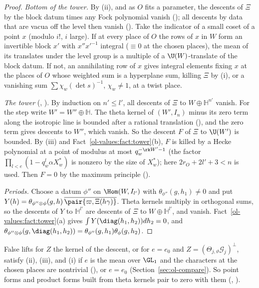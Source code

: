 \begin{proof}
\emph{Bottom of the tower.} By (ii), and as $O$ fits a parameter, the descents of $\Xi$ by the block
datum times any Fock polynomial vanish (); all descents
by data that are vacua off the level then vanish
(). Take the indicator of a small coset of a point $x$ (modulo $i!$, $i$ large). If at every place of
$O$ the rows of $x$ in $W$ form an invertible block $x'$ with $x''x'^{-1}$ integral ($\equiv0$ at
the chosen places), the mean of its translates under the level group is a multiple of a
$\U(W)$-translate of the block datum. If not, an annihilating row of $x$ gives integral elements
fixing $x$ at the places of $O$ whose weighted sum is a hyperplane sum, killing $\Xi$ by (i), or a
vanishing sum $\sum\chi_w(\det s)^{-1}$, $\chi_w\ne1$, at a twist place.

\emph{The tower} (,
). By induction on $n'\le l'$, all descents of $\Xi$ to
$W\oplus\mathbb H^{n'}$ vanish. For the step write $W'=W''\oplus\mathbb H$. The theta kernel of
$(W',I_n)$ minus its zero term along the isotropic line is bounded after a rational translation
(), and the zero term gives descents to
$W''$, which vanish. So the descent $F$ of $\Xi$ to $\U(W')$ is bounded. By (iii) and
Fact~\ref{ol-values:fact:tower}(b), $F$ is killed by a Hecke polynomial at a point of modulus at
most $q_w^{-\rk W'-1}$ (the factor $\prod_{l<e}(1-q_w^l\alpha X^*_w)$ is nonzero by the size of
$X^*_w$); here $2r_O+2l'+3<n$ is used. Then $F=0$ by the maximum principle
().

\emph{Periods.} Choose a datum $\phi''$ on $\Hom(W,I_{l'})$ with $\theta_{\phi''}(g,h_1)\ne0$ and put
$Y(h)=\theta_{\phi''\otimes\phi}(g,h)\,\overline{\pair{\varpi,\Xi(h\gamma)}}$. Theta kernels multiply
in orthogonal sums, so the descents of $Y$ to $\mathbb H^{l'}$ are descents of $\Xi$ to
$W\oplus\mathbb H^{l'}$, and vanish. Fact~\ref{ol-values:fact:tower}(a) gives
$\int Y(\diag(h_1,h_2))dh_2=0$, and $\theta_{\phi''\otimes\phi}(g,\diag(h_1,h_2))=
\theta_{\phi''}(g,h_1)\theta_\phi(g,h_2)$.
\end{proof}

False lifts for $Z$ the kernel of the descent, or for $e=e_0$ and
$Z=(\Theta_{j,\vartheta}\mathcal G_j)^\perp$, satisfy (ii), (iii), and (i) if $e$ is the mean over
$\GL_1$ and the characters at the
chosen places are nontrivial (), or $e=e_0$
(Section~\ref{sec:ol-compare}). So point forms and product forms built from theta kernels pair to
zero with them (,
).

